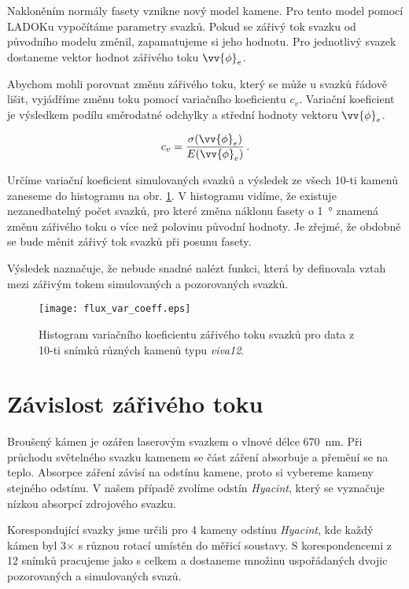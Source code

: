 	Nakloněním normály fasety vznikne nový model kamene. Pro tento model pomocí LADOKu  vypočítáme parametry svazků. Pokud se zářivý tok svazku od původního modelu změnil, zapamatujeme si jeho hodnotu. Pro jednotlivý svazek dostaneme vektor hodnot zářivého toku $\vv{\phi}_e$. 
	
	 Abychom mohli porovnat změnu zářivého toku, který se může u svazků řádově lišit, vyjádříme změnu toku pomocí variačního koeficientu $c_v$. Variační koeficient je výsledkem podílu směrodatné odchylky a střední hodnoty vektoru $\vv{\phi}_e$. 
	 
	 \begin{equation}	 
	 c_v = \frac{\sigma(\vv{\phi}_e)}{E(\vv{\phi}_e)}\,. 
	 \end{equation}
	 
Určíme variační koeficient simulovaných svazků a výsledek ze všech 10-ti kamenů zaneseme do histogramu na obr. \ref{fig: flux_var_coeff}. V histogramu vidíme, že existuje nezanedbatelný počet svazků, pro které změna náklonu fasety o \SI{1}{\degree} znamená změnu zářivého toku o více než polovinu původní hodnoty. Je zřejmé, že obdobně se bude měnit zářivý tok svazků při posunu fasety. 

 Výsledek naznačuje, že nebude snadné nalézt funkci, která by definovala vztah mezi zářivým tokem simulovaných a pozorovaných svazků.  

\begin{figure}[htps]
\centering
\texttt{[image: flux\_var\_coeff.eps]}
\caption{Histogram variačního koeficientu zářivého toku svazků pro data z 10-ti snímků různých kamenů typu \textit{viva12}.}
\label{fig: flux_var_coeff}
\end{figure}



\section{Závislost zářivého toku}
\label{sec: tok_zavislost}
	Broušený kámen je ozářen laserovým svazkem o vlnové délce \SI{670}{\nano\metre}. Při průchodu světelného svazku kamenem se část záření absorbuje a přemění se na teplo. Absorpce záření závisí na odstínu kamene, proto si vybereme kameny stejného odstínu. V našem případě zvolíme odstín \textit{Hyacint}, který se vyznačuje nízkou absorpcí zdrojového svazku. 
	
	Korespondující svazky jsme určili pro 4 kameny odstínu \textit{Hyacint}, kde každý kámen byl 3$\times$ s různou rotací umístěn do měřicí soustavy. S korespondencemi z 12 snímků pracujeme jako s celkem a dostaneme množinu uspořádaných dvojic pozorovaných a simulovaných svazů. 
	
